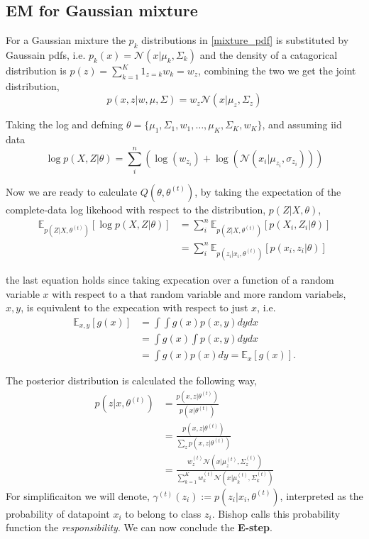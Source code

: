  \subsection{EM for Gaussian mixture}
 For a Gaussian mixture the $p_k$ distributions in \eqref{mixture_pdf} is substituted by Gaussain pdfs, 
 i.e. $p_k(x) = \mathcal{N}(x| \mu_k , \Sigma_k)$
 and the density of a catagorical distribution is $p(z) = \sum_{k=1}^K 1_{z=k} w_k = w_z$, combining the two
 we get the joint distribution, 
 $$p(x,z|w,\mu , \Sigma) = w_z \mathcal{N}(x| \mu_z , \Sigma_z)$$

 Taking the log and defning $\theta = \{\mu_1 , \Sigma_1,w_1, \dots, \mu_K , \Sigma_K, w_K\}$, and assuming iid data
 $$\log p(X,Z| \theta) = \sum_{i}^n \left(\log(w_{z_i})+\log(\mathcal{N}(x_i| \mu_{z_i} , \sigma_{z_i}))\right)$$

Now we are ready to calculate $Q(\theta, \theta^{(t)})$, by taking the expectation of the complete-data log likehood
with respect to the distribution, $p(Z|X, \theta)$, 
\begin{align*}
    \mathbb{E}_{p(Z|X,  \theta^{(t)})}[\log p(X,Z| \theta)] &=\sum_{i}^n  \mathbb{E}_{p(Z|X,  \theta^{(t)})}[p(X_i,Z_i| \theta) ]\\
    &=\sum_{i}^n  \mathbb{E}_{p(z_i|x_i,  \theta^{(t)})}[p(x_i,z_i| \theta) ]
\end{align*}

\begin{note2}
    the last equation holds since taking expecation over a function of a random variable $x$ with respect to a that random
    variable and more random variabels, $x,y$, is equivalent to the expecation with respect to just $x$, i.e. 
    \begin{align*}
        \mathbb{E}_{x,y}[g(x)] &= \int\int g(x) p(x,y) dy dx\\
         &= \int g(x) \int p(x,y) dy dx \\
        &= \int g(x) p(x) dy = \mathbb{E}_x[g(x)].
    \end{align*}
\end{note2}
The posterior distribution is calculated the following way,
\begin{align*}
    p(z|x, \theta^{(t)}) &= \frac{p(x,z|\theta^{(t)})}{p(x|\theta^{(t)})} \\
    &= \frac{p(x,z|\theta^{(t)})}{\sum_{z} p(x,z|\theta^{(t)})}\\
    &= \frac{w_z^{(t)} \mathcal{N}(x|\mu_z^{(t)}, \Sigma_z^{(t)})}{\sum_{k=1}^K w_k^{(t)} 
    \mathcal{N}(x|\mu_k^{(t)}, \Sigma_k^{(t)})}
\end{align*}
For simplificaiton we will denote, $\gamma^{(t)}(z_i) := p(z_i|x_i, \theta^{(t)})$, 
interpreted as the probability of datapoint $x_i$ to belong to class $z_i$. Bishop \cite{bishop}
calls this probability function the \textit{responsibility}. We can now conclude the \textbf{E-step}.


